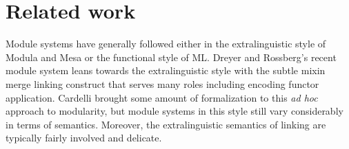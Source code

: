 \documentclass[12pt]{article}
\begin{document}


\section{Related work}
Module systems have generally followed either in the extralinguistic style of Modula and Mesa or the functional style of ML. Dreyer and Rossberg's recent module system leans towards the extralinguistic style with the subtle mixin merge linking construct that serves many roles including encoding functor application. Cardelli \cite{cardelli97} brought some amount of formalization to this {\it ad hoc} approach to modularity, but module systems in this style still vary considerably in terms of semantics. Moreover, the extralinguistic semantics of linking are typically fairly involved and delicate.
\end{document}
